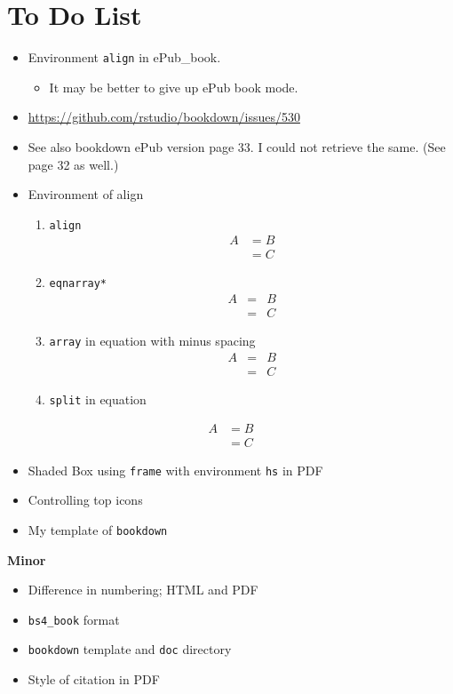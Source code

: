 \documentclass[
]{book}
\providecommand{\tightlist}{%
  \setlength{\itemsep}{0pt}\setlength{\parskip}{0pt}}
\theoremstyle{definition}
\theoremstyle{definition}
\theoremstyle{definition}
\theoremstyle{definition}
\theoremstyle{remark}
\begin{document}
\hypertarget{to-do-list}{%
\section{To Do List}\label{to-do-list}}

\begin{itemize}
\item
  Environment \texttt{align} in ePub\_book.

  \begin{itemize}
  \tightlist
  \item
    It may be better to give up ePub book mode.
  \end{itemize}
\item
  \url{https://github.com/rstudio/bookdown/issues/530}
\item
  See also bookdown ePub version page 33. I could not retrieve the same. (See page 32 as well.)
\item
  Environment of align

  \begin{enumerate}
  \def\labelenumi{\arabic{enumi}.}
  \item
    \texttt{align}
    \begin{align}
    A & = B\\
    & = C
    \end{align}
  \item
    \texttt{eqnarray*}
    \begin{eqnarray*}
    A &=& B\\
    & = & C
    \end{eqnarray*}
  \item
    \texttt{array} in equation with minus spacing
    \[
    \begin{array}{lcl}
    A & \!\!=\!\! & B\\
    & \!\!=\!\! & C
    \end{array}
    \]
  \item
    \texttt{split} in equation
  \end{enumerate}
\end{itemize}

\begin{equation}
\begin{split}
A & = B\\
& = C
\end{split}
\label{eq:var-beta}
\end{equation}

\begin{itemize}
\tightlist
\item
  Shaded Box using \texttt{frame} with environment \texttt{hs} in PDF
\item
  Controlling top icons
\item
  My template of \texttt{bookdown}
\end{itemize}

\textbf{Minor}

\begin{itemize}
\tightlist
\item
  Difference in numbering; HTML and PDF
\item
  \texttt{bs4\_book} format
\item
  \texttt{bookdown} template and \texttt{doc} directory
\item
  Style of citation in PDF
\end{itemize}

  

\printindex
\end{document}
